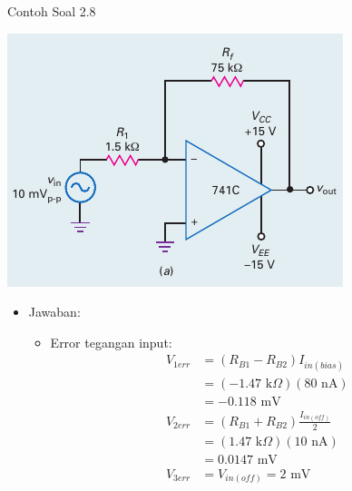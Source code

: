 \begin{frame}{Contoh Soal 2.8}
	\begin{multicols}{2}
		\begin{center}
			\includegraphics[width=\linewidth]{gambar/fig-16.17a}
		\end{center}
		\columnbreak
		\begin{itemize}
			\item Jawaban:
			\begin{itemize}
				\item Error tegangan input:
				\begin{align*}
					V_{1err} &= (R_{B1} - R_{B2})I_{in(bias)} \\
					&= ( - 1.47 \text{ k}\Omega )(80 \text{ nA}) \\
					&= -0.118 \text{ mV} \\
					V_{2err} &= (R_{B1} + R_{B2}) \frac{I_{in(off)}}{2} \\
					&= ( 1.47 \text{ k}\Omega )(10 \text{ nA}) \\
					&= 0.0147 \text{ mV} \\
					V_{3err} &= V_{in(off)} = 2 \text{ mV}
				\end{align*}
			\end{itemize}
		\end{itemize}
	\end{multicols}
\end{frame}

